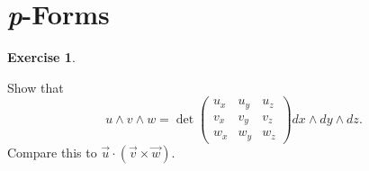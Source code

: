 \documentclass[11pt, a4paper]{report}
\theoremstyle{definition}
\newtheorem{exercise}{Exercise}[part]
\newenvironment{ex}{\begin{exercise}}{\end{exercise}\pagebreak[1]}
\begin{document}
\section{\emph{p}-Forms}\label{sec:pforms}

\begin{ex}\label{ex:triplewedgeproduct}

Show that
\[
    u \wedge v \wedge w = \det \begin{pmatrix}
            u_x & u_y & u_z \\
            v_x & v_y & v_z \\
            w_x & w_y & w_z
        \end{pmatrix} dx \wedge dy \wedge dz.
\]
Compare this to $\vec{u} \cdot (\vec{v} \times \vec{w})$.

\end{ex}
\end{document}
